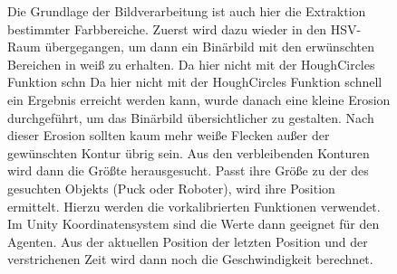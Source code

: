 \begin{figure} [h]
\begin{minipage}[t]{0.35\textwidth}
\vspace{0pt}
Die Grundlage der Bildverarbeitung ist auch hier die Extraktion bestimmter Farbbereiche. Zuerst wird dazu wieder in den HSV-Raum übergegangen, um dann ein Binärbild mit den erwünschten Bereichen in weiß zu erhalten. Da hier nicht mit der HoughCircles Funktion schn Da hier nicht mit der HoughCircles Funktion schnell ein Ergebnis erreicht werden kann, wurde danach eine kleine Erosion durchgeführt, um das Binärbild übersichtlicher zu gestalten. Nach dieser Erosion sollten kaum mehr weiße Flecken außer der gewünschten Kontur übrig sein. Aus den verbleibenden Konturen wird dann die Größte herausgesucht. Passt ihre Größe zu der des gesuchten Objekts (Puck oder Roboter), wird ihre Position ermittelt. Hierzu werden die vorkalibrierten Funktionen verwendet. Im Unity Koordinatensystem sind die Werte dann geeignet für den Agenten. Aus der aktuellen Position der letzten Position und der verstrichenen Zeit wird dann noch die Geschwindigkeit berechnet.
\end{minipage}
\hspace{0.1\textwidth}
\begin{minipage}[t]{0.45\textwidth}
\vspace{0pt}

\end{minipage}
\end{figure}
